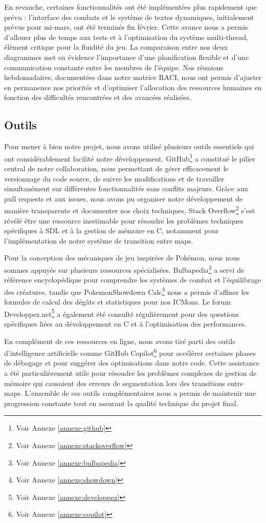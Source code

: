 \documentclass[12pt,a4paper, twoside]{article}
\begin{document}
En revanche, certaines fonctionnalités ont été implémentées plus rapidement que prévu : l'interface des combats et le système de textes dynamiques, initialement prévus pour mi-mars, ont été terminés fin février. Cette avance nous a permis d'allouer plus de temps aux tests et à l'optimisation du système multi-thread, élément critique pour la fluidité du jeu. La comparaison entre nos deux diagrammes met en évidence l'importance d'une planification flexible et d'une communication constante entre les membres de l'équipe. Nos réunions hebdomadaires, documentées dans notre matrice RACI, nous ont permis d'ajuster en permanence nos priorités et d'optimiser l'allocation des ressources humaines en fonction des difficultés rencontrées et des avancées réalisées.

\subsection{Outils}
Pour mener à bien notre projet, nous avons utilisé plusieurs outils essentiels qui ont considérablement facilité notre développement. GitHub\footnote{Voir Annexe \ref{annexe:github}} a constitué le pilier central de notre collaboration, nous permettant de gérer efficacement le versionnage du code source, de suivre les modifications et de travailler simultanément sur différentes fonctionnalités sans conflits majeurs. Grâce aux pull requests et aux issues, nous avons pu organiser notre développement de manière transparente et documenter nos choix techniques. Stack Overflow\footnote{Voir Annexe \ref{annexe:stackoverflow}} s'est révélé être une ressource inestimable pour résoudre les problèmes techniques spécifiques à SDL et à la gestion de mémoire en C, notamment pour l'implémentation de notre système de transition entre maps.

Pour la conception des mécaniques de jeu inspirées de Pokémon, nous nous sommes appuyés sur plusieurs ressources spécialisées. Bulbapedia\footnote{Voir Annexe \ref{annexe:bulbapedia}} a servi de référence encyclopédique pour comprendre les systèmes de combat et l'équilibrage des créatures, tandis que PokemonShowdown Calc\footnote{Voir Annexe \ref{annexe:showdown}} nous a permis d'affiner les formules de calcul des dégâts et statistiques pour nos ICMons. Le forum Developpez.net\footnote{Voir Annexe \ref{annexe:developpez}} a également été consulté régulièrement pour des questions spécifiques liées au développement en C et à l'optimisation des performances.

En complément de ces ressources en ligne, nous avons tiré parti des outils d'intelligence artificielle comme GitHub Copilot\footnote{Voir Annexe \ref{annexe:copilot}} pour accélérer certaines phases de débogage et pour suggérer des optimisations dans notre code. Cette assistance a été particulièrement utile pour résoudre les problèmes complexes de gestion de mémoire qui causaient des erreurs de segmentation lors des transitions entre maps. L'ensemble de ces outils complémentaires nous a permis de maintenir une progression constante tout en assurant la qualité technique du projet final.
\newpage
\end{document}

